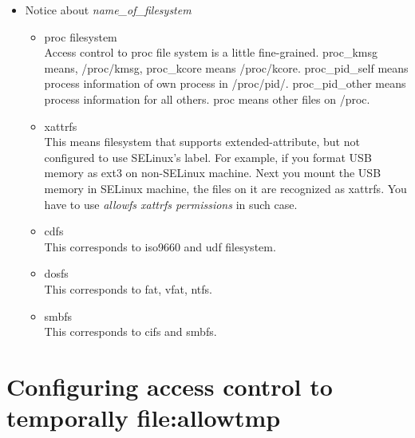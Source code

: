 \documentclass{article}
\begin{document}
\begin{itemize}
 \item Notice about {\it name\_of\_filesystem}
       \begin{itemize}
	\item proc filesystem\\
	      Access control to proc file system is a little
	      fine-grained. proc\_kmsg means, /proc/kmsg, proc\_kcore
	      means /proc/kcore. proc\_pid\_self means process information of
	      own process in /proc/pid/. proc\_pid\_other means process information for all
	      others. proc means other files on /proc. 
	\item xattrfs\\
	      This means filesystem that supports extended-attribute,
	      but not configured to use SELinux's label. For example, if
	      you format USB memory as ext3 on non-SELinux machine. Next
	      you mount the USB memory in SELinux machine, 
	      the files on it are recognized
	      as xattrfs. You have to use {\it allowfs xattrfs
	      permissions} in such case.
	\item cdfs\\
	      This corresponds to iso9660 and udf filesystem.
	\item dosfs\\
	      This corresponds to fat, vfat, ntfs.
	\item smbfs\\
	      This corresponds to cifs and smbfs.
       \end{itemize}
\end{itemize}

\section{Configuring access control to temporally file:allowtmp}
\end{document}
